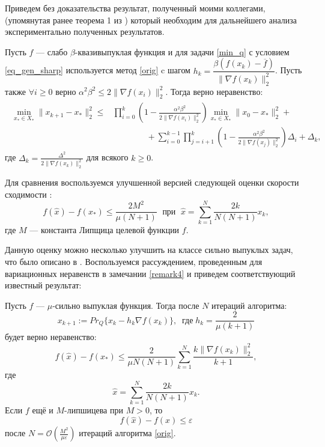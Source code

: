     Приведем без доказательства результат, полученный моими коллегами, (упомянутая ранее теорема 1 из \cite{sharp22}) который необходим для дальнейшего анализа экспериментально полученных результатов.
    \begin{theorem}\label{theorem1}
        Пусть $f$ --- слабо $\beta$-квазивыпуклая функция и для задачи \eqref{min_q} с условием \eqref{eq_gen_sharp} используется метод \eqref{orig} c шагом
        $h_k = \dfrac{\beta(f(x_k) - \overline{f})}{\| \nabla f(x_k) \|_2^2}$. Пусть также $\forall i \geq 0$ верно $\alpha^2 \beta^2 \leq 2 \| \nabla f(x_i) \|_2^2$. Тогда верно неравенство:
        \begin{gather}\label{adaptive_estimate}
            \begin{aligned}
            \min_{x_* \in X_*} \|x_{k+1} - x_* \|_2^2 \leq &  \prod_{i=0}^k \left ( 1 - \frac{\alpha^2\beta^2}{2 \| \nabla f(x_i) \|_2^2} \right ) \min_{x_* \in X_*} \|x_0 - x_* \|_2^2 + \\& 
            \qquad \qquad + \sum_{i=0}^{k-1} \prod_{j=i+1}^k \left ( 1 - \frac{\alpha^2\beta^2}{2 \| \nabla f(x_j) \|_2^2} \right )\Delta_i + \Delta_k,
            \end{aligned}
        \end{gather}
        где $\Delta_k = \frac{\Delta^2}{2 \| \nabla f(x_k) \|_2^2}$ для всякого $k \geqslant 0$.
    \end{theorem}

    Для сравнения воспользуемся улучшенной версией следующей оценки скорости сходимости \cite{Bach_2012}:
    \begin{equation}\label{orig_estimation_f}
        f(\widehat{x}) - f(x_*) \leq \frac{2 M^2}{\mu (N+1)}  \; \text{  при   } \; \widehat{x} = \sum\limits_{k=1}^{N} \frac{2 k}{N (N+1)} x_k, 
    \end{equation}
    где $M$ --- константа Липщица целевой функции $f$.

    Данную оценку можно несколько улучшить на классе сильно выпуклых задач, что было описано в \cite{Stonyakin_2021}. Воспользуемся рассуждением, проведенным для вариационных неравенств в замечании \ref{remark4} и приведем соответствующий известный результат:
    \begin{theorem}\label{ThmBachAdaptive}
        Пусть $f$ --- $\mu$-сильно выпуклая функция. Тогда после $N$ итераций алгоритма:
        $$
            x_{k+1} := Pr_{Q}\{x_k - h_k \nabla f(x_k) \}, \;\; \textit{где} \; h_k = \frac{2}{\mu (k+1)}
        $$
        будет верно неравенство:
        \begin{equation}\label{adaptive_estimation_f}
            f(\widehat{x}) - f(x_*) \leq \frac{2}{\mu N (N+1)} \sum_{k=1}^{N} \frac{k \|\nabla f(x_k)\|_2^2}{k+1},
        \end{equation}
        где
        $$
            \widehat{x} = \sum_{k=1}^{N} \frac{2 k}{N (N+1)} x_k.
        $$
        Если $f$ ещё и $M$-липшицева при $M >0$, то
        $$
             f(\widehat{x}) - f(x) \leq \varepsilon
        $$
        после $N = \mathcal{O}(\frac{M^2}{\mu\varepsilon})$ итераций алгоритма \eqref{orig}.
    \end{theorem}

